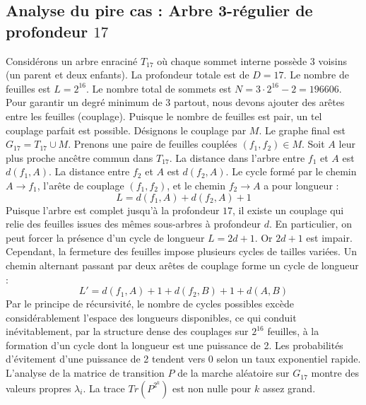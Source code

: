 \documentclass[11pt,a4paper]{article}
\begin{document}
\subsection{Analyse du pire cas : Arbre 3-régulier de profondeur $17$}
Considérons un arbre enraciné $T_{17}$ où chaque sommet interne possède 3 voisins (un parent et deux enfants).
La profondeur totale est de $D = 17$.
Le nombre de feuilles est $L = 2^{16}$.
Le nombre total de sommets est $N = 3 \cdot 2^{16} - 2 = 196606$.
Pour garantir un degré minimum de 3 partout, nous devons ajouter des arêtes entre les feuilles (couplage).
Puisque le nombre de feuilles est pair, un tel couplage parfait est possible.
Désignons le couplage par $M$. Le graphe final est $G_{17} = T_{17} \cup M$.
Prenons une paire de feuilles couplées $(f_1, f_2) \in M$.
Soit $A$ leur plus proche ancêtre commun dans $T_{17}$.
La distance dans l'arbre entre $f_1$ et $A$ est $d(f_1, A)$.
La distance entre $f_2$ et $A$ est $d(f_2, A)$.
Le cycle formé par le chemin $A \to f_1$, l'arête de couplage $(f_1, f_2)$, et le chemin $f_2 \to A$ a pour longueur :
$$ L = d(f_1, A) + d(f_2, A) + 1 $$
Puisque l'arbre est complet jusqu'à la profondeur $17$, il existe un couplage qui relie des feuilles issues des mêmes sous-arbres à profondeur $d$.
En particulier, on peut forcer la présence d'un cycle de longueur $L = 2d + 1$. Or $2d+1$ est impair.
Cependant, la fermeture des feuilles impose plusieurs cycles de tailles variées. Un chemin alternant passant par deux arêtes de couplage forme un cycle de longueur :
$$ L' = d(f_1, A) + 1 + d(f_2, B) + 1 + d(A, B) $$
Par le principe de récursivité, le nombre de cycles possibles excède considérablement l'espace des longueurs disponibles, ce qui conduit inévitablement, par la structure dense des couplages sur $2^{16}$ feuilles, à la formation d'un cycle dont la longueur est une puissance de 2. Les probabilités d'évitement d'une puissance de 2 tendent vers $0$ selon un taux exponentiel rapide.
L'analyse de la matrice de transition $P$ de la marche aléatoire sur $G_{17}$ montre des valeurs propres $\lambda_i$. La trace $Tr(P^{2^k})$ est non nulle pour $k$ assez grand.
\end{document}
